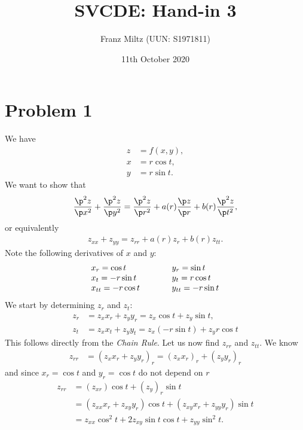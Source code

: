 \documentclass{article}
\begin{document}
\title{SVCDE: Hand-in 3}
\author{Franz Miltz (UUN: S1971811)}
\date{11th October 2020}
\maketitle


\section*{Problem 1}


We have
\begin{align*}
  z & = f(x,y),  \\
  x & = r\cos t, \\
  y & = r\sin t.
\end{align*}
We want to show that
\begin{align*}
  \frac{\p^2 z}{\p x^2}+\frac{\p^2 z}{\p y^2}
  = \frac{\p^2 z}{\p r^2}+a(r)\frac{\p z}{\p r}+b(r)\frac{\p^2 z}{\p t^2},
\end{align*}
or equivalently
\begin{align}
  \label{eq1}
  z_{xx} + z_{yy} = z_{rr} + a(r)z_r + b(r)z_{tt}.
\end{align}
Note the following derivatives of $x$ and $y$:
\begin{align*}
  \begin{array}{l l}
    x_r = \cos t      & \hspace{1cm} y_r = \sin t      \\
    x_t = -r\sin t    & \hspace{1cm} y_t = r\cos t     \\
    x_{tt} = -r\cos t & \hspace{1cm} y_{tt} = -r\sin t
  \end{array}
\end{align*}
We start by determining $z_r$ and $z_t$:
\begin{align*}
  z_r & = z_x x_r + z_y y_r = z_x \cos t + z_y \sin t,     \\
  z_t & = z_x x_t + z_y y_t = z_x (-r\sin t) + z_y r\cos t
\end{align*}
This follows directly from the \emph{Chain Rule}.
Let us now find $z_{rr}$ and $z_{tt}$. We know
\begin{align*}
  z_{rr} & = (z_x x_r + z_y y_r)_r = (z_x x_r)_r + (z_y y_r)_r
\end{align*}
and since $x_r = \cos t$ and $y_r = \cos t$ do not depend on $r$
\begin{align*}
  z_{rr} & = (z_{xr})\cos t + (z_y)_r \sin t                              \\
         & =(z_{xx}x_r + z_{xy}y_r)\cos t + (z_{xy}x_r + z_{yy}y_r)\sin t \\
         & =z_{xx}\cos^2 t + 2 z_{xy}\sin t\cos t + z_{yy}\sin^2 t.
\end{align*}
\end{document}
